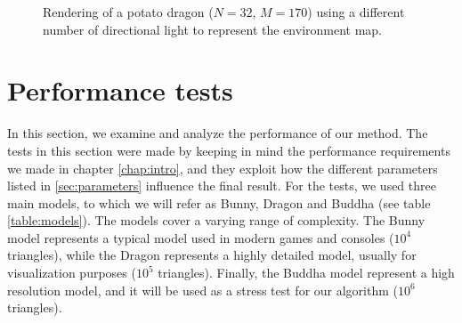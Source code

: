 \begin{figure}[!h]
\caption{Rendering of a potato dragon ($N = 32$, $M = 170$) using a different number of directional light to represent the environment map.}
\label{fig:dragonenv}
\end{figure}

\clearpage
\section{Performance tests}
\label{sec:perf}
In this section, we examine and analyze the performance of our method. The tests in this section were made by keeping in mind the performance requirements we made in chapter \ref{chap:intro}, and they exploit how the different parameters listed in \ref{sec:parameters} influence the final result. For the tests, we used three main models, to which we will refer as Bunny, Dragon and Buddha (see table \ref{table:models}). The models cover a varying range of complexity. The Bunny model represents a typical model used in modern games and consoles ($10^4$ triangles), while the Dragon represents a highly detailed model, usually for visualization purposes ($10^5$ triangles). Finally, the Buddha model represent a high resolution model, and it will be used as a stress test for our algorithm ($10^6$ triangles).

